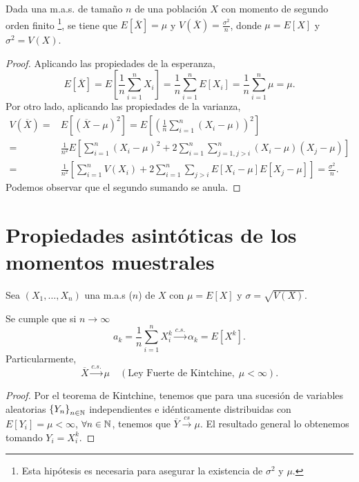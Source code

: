 \begin{prop}
	Dada una m.a.s. de tamaño $\displaystyle n $ de una población $\displaystyle X $ con momento de segundo orden finito \footnote{Esta hipótesis es necesaria para asegurar la existencia de $\displaystyle \sigma^{2} $ y $\displaystyle \mu $.}, se tiene que $\displaystyle E[\overline{X}] = \mu$ y $\displaystyle V\left(\overline{X}\right)= \frac{\sigma ^{2}}{n} $, donde $\displaystyle \mu = E[X] $ y $\displaystyle \sigma^{2}= V\left(X\right) $. 
\end{prop}
\begin{proof}
Aplicando las propiedades de la esperanza,
\[E\left[\overline{X}\right] = E\left[\frac{1}{n}\sum^{n}_{i = 1}X_{i}\right] = \frac{1}{n}\sum^{n}_{i = 1}E\left[X_{i}\right] =\frac{1}{n}\sum^{n}_{i = 1}\mu = \mu .\]
Por otro lado, aplicando las propiedades de la varianza,
\[
\begin{split}
	V\left(\overline{X}\right) = & E\left[\left(\overline{X}-\mu\right)^{2}\right] = E\left[\left(\frac{1}{n}\sum^{n}_{i = 1}\left(X_{i}-\mu\right)\right)^{2}\right] \\
	= & \frac{1}{n^{2}}E\left[\sum^{n}_{i = 1}\left(X_{i}-\mu\right)^{2}+2\sum^{n}_{i=1}\sum^{n}_{j = 1, j > i}\left(X_{i}-\mu\right)\left(X_{j}-\mu\right)\right] \\
	= & \frac{1}{n^{2}}\left[\sum^{n}_{i = 1}V\left(X_{i}\right) + 2\sum^{n}_{i = 1}\sum_{j > i}E\left[X_{i}-\mu\right] E\left[X_{j}-\mu\right] \right] = \frac{\sigma^{2}}{n}  .
\end{split}
\]
Podemos observar que el segundo sumando se anula. 
\end{proof}

\section{Propiedades asintóticas de los momentos muestrales}
Sea $\displaystyle \left(X_{1}, \ldots, X_{n}\right) $ una m.a.s ($\displaystyle n $) de $\displaystyle X $ con $\displaystyle \mu = E\left[X\right]  $ y $\displaystyle \sigma = \sqrt{V\left(X\right)} $. 
\begin{prop}
	Se cumple que si $\displaystyle n \to \infty $ 
	\[a_{k} = \frac{1}{n}\sum^{n}_{i = 1}X_{i}^{k} \xrightarrow{c.s.} \alpha_{k} = E\left[X^{k}\right]  .\]
	Particularmente,
	\[\overline{X}\xrightarrow{c.s.} \mu \quad \left(\text{Ley Fuerte de Kintchine}, \; \mu < \infty\right) .\]
\end{prop}
\begin{proof}
	Por el teorema de Kintchine, tenemos que para una sucesión de variables aleatorias $\displaystyle \left\{ Y_{n}\right\} _{n\in\mathbb{N}} $ independientes e idénticamente distribuidas con $\displaystyle E\left[Y_{i}\right] =\mu < \infty$, $\displaystyle \forall n \in \mathbb{N} $, tenemos que $\displaystyle \overline{Y}\xrightarrow{cs} \mu $. El resultado general lo obtenemos tomando $\displaystyle Y_{i}=X_{i}^{k} $.
\end{proof}

